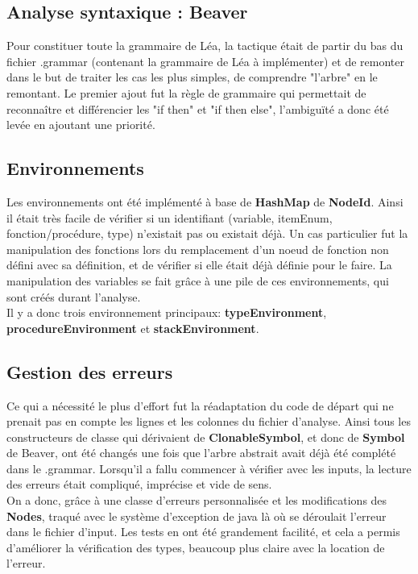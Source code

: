 \documentclass{article}
\begin{document}
\subsection{Analyse syntaxique : Beaver}
Pour constituer toute la grammaire de Léa, la tactique était de partir du bas du fichier .grammar (contenant la grammaire de Léa à implémenter) et de remonter dans le but de traiter les cas les plus simples, de comprendre "l'arbre" en le remontant. Le premier ajout fut la règle de grammaire qui permettait de reconnaître et différencier les "if then" et "if then else", l'ambiguïté a donc été levée en ajoutant une priorité.\\

\subsection{Environnements}
Les environnements ont été implémenté à base de \textbf{HashMap} de \textbf{NodeId}. Ainsi il était très facile de vérifier si un identifiant (variable, itemEnum, fonction/procédure, type)  n'existait pas ou existait déjà. Un cas particulier fut la manipulation des fonctions lors du remplacement d'un noeud de fonction non défini avec sa définition, et de vérifier si elle était déjà définie pour le faire. La manipulation des variables se fait grâce à une pile de ces environnements, qui sont créés durant l'analyse.\\
Il y a donc trois environnement principaux: \textbf{typeEnvironment}, \textbf{procedureEnvironment} et \textbf{stackEnvironment}.\\

\subsection{Gestion des erreurs}
Ce qui a nécessité le plus d'effort fut la réadaptation du code de départ qui ne prenait pas en compte les lignes et les colonnes du fichier d'analyse. Ainsi tous les constructeurs de classe qui dérivaient de \textbf{ClonableSymbol}, et donc de \textbf{Symbol} de Beaver, ont été changés une fois que l'arbre abstrait avait déjà été complété dans le .grammar. Lorsqu'il a fallu commencer à vérifier avec les inputs, la lecture des erreurs était compliqué, imprécise et vide de sens.\\
On a donc, grâce à une classe d'erreurs personnalisée et les modifications des \textbf{Nodes}, traqué avec le système d'exception de java là où se déroulait l'erreur dans le fichier d'input. Les tests en ont été grandement facilité, et cela a permis d'améliorer la vérification des types, beaucoup plus claire avec la location de l'erreur.
\end{document}
